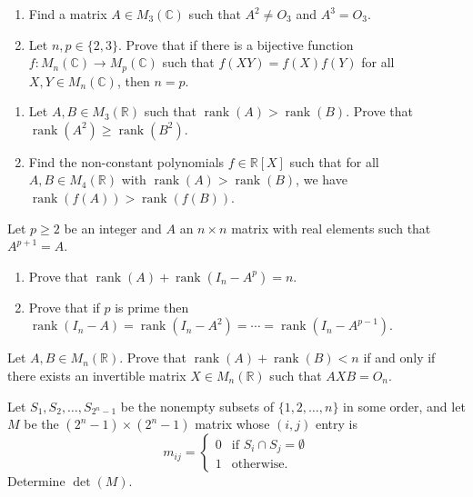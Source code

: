 \documentclass[12pt]{article}
\begin{document}
\begin{problem}
\begin{enumerate}[label=(\alph*)]
\item Find a matrix $A\in M_3(\mathbb{C})$ such that $A^2\ne O_3$ and $A^3=O_3$.
\item Let $n,p\in\{2,3\}$. Prove that if there is a bijective function $f:M_n(\mathbb{C})\to M_p(\mathbb{C})$ such that $f(XY)=f(X)f(Y)$ for all $X,Y\in M_n(\mathbb{C})$, then $n=p$.
\end{enumerate}
\end{problem}

\begin{problem}
\begin{enumerate}[label=(\alph*)]
\item Let $A,B\in M_3(\mathbb{R})$ such that $\operatorname{rank}(A) > \operatorname{rank}(B)$. Prove that $\operatorname{rank}(A^2) \ge \operatorname{rank}(B^2)$.
\item Find the non-constant polynomials $f\in\mathbb{R}[X]$ such that for all $A,B\in M_4(\mathbb{R})$ with $\operatorname{rank}(A)>\operatorname{rank}(B)$, we have $\operatorname{rank}(f(A)) > \operatorname{rank}(f(B))$.
\end{enumerate}
\end{problem}

\begin{problem}
Let $p\ge 2$ be an integer and $A$ an $n\times n$ matrix with real elements such that $A^{p+1}=A$.
\begin{enumerate}[label=(\alph*)]
\item Prove that $\operatorname{rank}(A) + \operatorname{rank}(I_n-A^p) = n$.
\item Prove that if $p$ is prime then $\operatorname{rank}(I_n-A) = \operatorname{rank}(I_n-A^2) = \cdots = \operatorname{rank}(I_n-A^{p-1})$.
\end{enumerate}
\end{problem}

\begin{problem}
Let $A,B\in M_n(\mathbb{R})$. Prove that $\operatorname{rank}(A)+\operatorname{rank}(B) < n$ if and only if there exists an invertible matrix $X\in M_n(\mathbb{R})$ such that $AXB=O_n$.
\end{problem}

\begin{problem}
Let $S_1,S_2,\dots,S_{2^n-1}$ be the nonempty subsets of $\{1,2,\dots,n\}$ in some order, and let $M$ be the $(2^n-1)\times(2^n-1)$ matrix whose $(i,j)$ entry is
\[
m_{ij} = \begin{cases} 0 & \text{if } S_i\cap S_j = \emptyset\\ 1 & \text{otherwise.}\end{cases}
\]
Determine $\det(M)$.
\end{problem}
\end{document}
